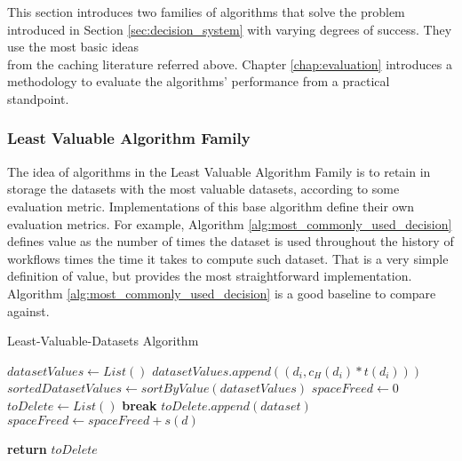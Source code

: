 This section introduces two families of algorithms that solve the problem introduced in Section \ref{sec:decision_system} with varying degrees of success. They use the most basic ideas\\ from the caching literature referred above. Chapter \ref{chap:evaluation} introduces a methodology to evaluate the algorithms' performance from a practical standpoint.

\subsubsection{Least Valuable Algorithm Family}
The idea of algorithms in the Least Valuable Algorithm Family is to retain in storage the datasets with the most valuable datasets, according to some evaluation metric. Implementations of this base algorithm define their own evaluation metrics.  For example, Algorithm \ref{alg:most_commonly_used_decision} defines value as the number of times the dataset is used throughout the history of workflows times the time it takes to compute such dataset. That is a very simple definition of value, but provides the most straightforward implementation.  Algorithm \ref{alg:most_commonly_used_decision} is a good baseline to compare against.

\begin{algorithm}
\begin{singlespace}
\caption{Least-Valuable-Datasets Algorithm}
\label{alg:most_commonly_used_decision}
\begin{algorithmic}[1]
	\State $datasetValues \gets List()$
		\State $datasetValues.append((d_i, c_H(d_i) * t(d_i)))$
	\EndFor
	\State $sortedDatasetValues \gets sortByValue(datasetValues)$
	\State $spaceFreed \gets 0$
	\State $toDelete \gets List()$
			\State \textbf{break}
		\EndIf	
		\State $toDelete.append(dataset)$
		\State $spaceFreed \gets spaceFreed + s(d)$
	\EndFor
	
	\State \textbf{return} $toDelete$
\EndProcedure
\end{algorithmic}
\end{singlespace}
\end{algorithm}


